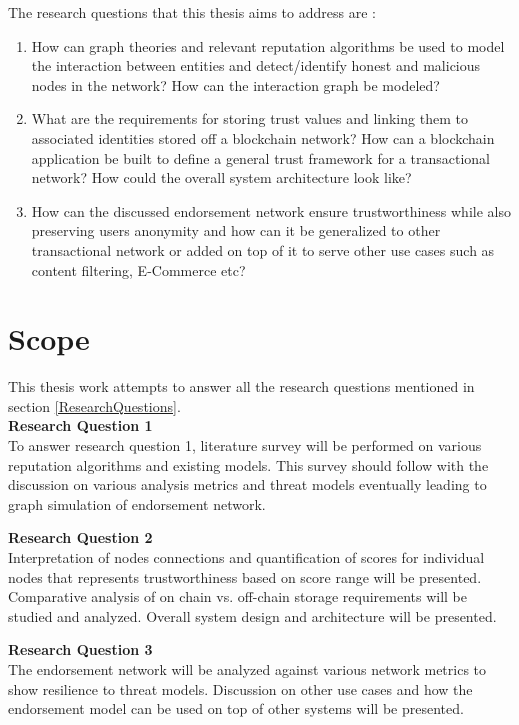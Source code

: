 The research questions that this thesis aims to address are : 
\begin{enumerate}
		\item How can graph theories and relevant reputation algorithms be used
			to model the interaction between entities and detect/identify
			honest and malicious nodes in the network? How can the interaction
			graph be modeled? \label{question1}
		\item What are the requirements for storing trust values and linking
			them to associated identities stored off a blockchain network? How
			can a blockchain application be built to define a general trust
			framework for a transactional network? How could the overall system
			architecture look like? \label{question2} 
		\item How can the discussed endorsement network ensure trustworthiness
			while also preserving users anonymity and how can it be generalized
			to other transactional network or added on top of it to serve other
			use cases such as content filtering, E-Commerce
			etc?\label{question3} 
\end{enumerate}

\section{Scope} 
This thesis work attempts to answer all the research questions mentioned
in section \ref{ResearchQuestions}. \\
\textbf{Research Question 1}\\
To answer research question 1, literature survey will be performed on various
reputation algorithms and existing models. This survey should follow with the
discussion on various analysis metrics and threat models eventually leading to
graph simulation of endorsement network.  

\textbf{Research Question 2 } \\
Interpretation of nodes connections and quantification of scores for individual
nodes that represents trustworthiness based on score range will be presented.
Comparative analysis of on chain vs. off-chain storage requirements will be
studied and analyzed. Overall system design and architecture will be presented. 

\textbf{Research Question 3} \\
The endorsement network will be analyzed against various network metrics to
show resilience to threat models. Discussion on other use cases and how the
endorsement model can be used on top of other systems will be presented.

